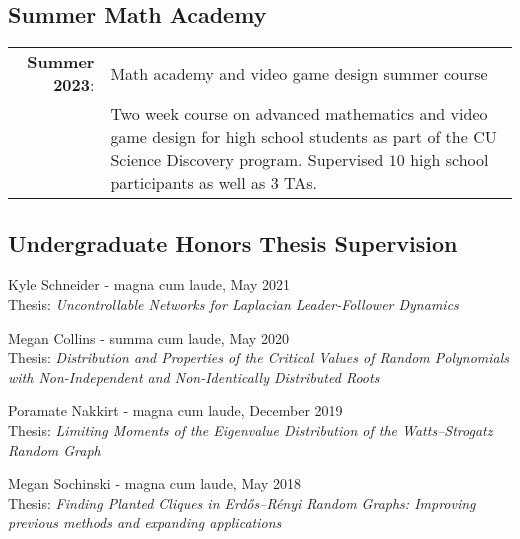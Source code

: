 \documentclass[letterpaper]{article}
\renewenvironment{itemize}{
  \begin{list}{}{
    \setlength{\leftmargin}{1em}
  }
}{
  \end{list}
}
\begin{document}
\subsection*{Summer Math Academy}
 \begin{tabular}{r p{4.65in}}
   {\bf Summer 2023}: & Math academy and video game design summer course \\
   & Two week course on advanced mathematics and video game design for high school students as part of the CU Science Discovery program.   Supervised $10$ high school participants as well as $3$ TAs. 
   \end{tabular}
   
\subsection*{Undergraduate Honors Thesis Supervision}
\begin{itemize}
	\item Kyle Schneider - magna cum laude, May 2021 \\
	Thesis: \textit{Uncontrollable Networks for Laplacian Leader-Follower Dynamics}
	\item Megan Collins - summa cum laude, May 2020 \\
	Thesis: \textit{Distribution and Properties of the Critical Values of Random Polynomials with Non-Independent and Non-Identically Distributed Roots}
	\item Poramate Nakkirt - magna cum laude, December 2019 \\
	Thesis: \textit{Limiting Moments of the Eigenvalue Distribution of the Watts--Strogatz Random Graph}
	\item Megan Sochinski - magna cum laude, May 2018 \\  
	Thesis: \textit{Finding Planted Cliques in Erd\H{o}s--R\'{e}nyi Random Graphs: Improving previous methods and expanding applications} 
\end{itemize}
\end{document}
